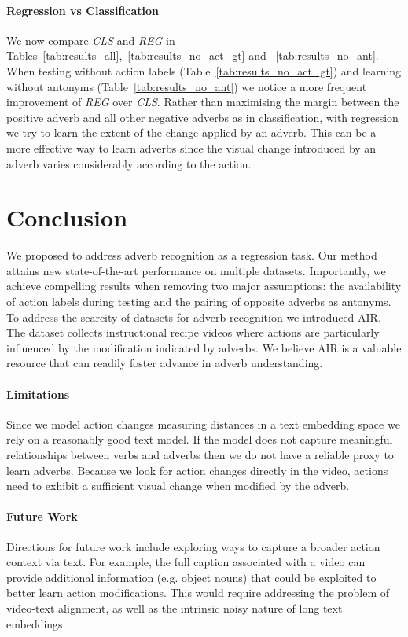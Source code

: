 \documentclass[10pt,twocolumn,letterpaper]{article}
\newcommand{\fparagraph}[1]{\paragraph{#1}}
\begin{document}
\vspace{-13pt}
\fparagraph{Regression vs Classification} We now compare \textit{CLS} and \textit{REG} in Tables~\ref{tab:results_all},~\ref{tab:results_no_act_gt} and ~\ref{tab:results_no_ant}. 
When testing without action labels (Table~\ref{tab:results_no_act_gt}) and learning without antonyms (Table~\ref{tab:results_no_ant}) we notice a more frequent improvement of \textit{REG} over \textit{CLS}.
Rather than maximising the margin between the positive adverb and all other negative adverbs as in classification, with regression we try to learn the extent of the change applied by an adverb. This can be a more effective way to learn adverbs 
since the visual change introduced by an adverb varies considerably according to the action. 

\vspace{-3pt}
\section{Conclusion}
\label{sec:conclusion}
\vspace{-2pt}

We proposed to address adverb recognition as a regression task. 
Our method attains new state-of-the-art performance on multiple datasets. Importantly, we 
achieve compelling results when removing two major assumptions: the availability of action labels during testing and the pairing of opposite adverbs as antonyms. 
To address the scarcity of datasets for adverb recognition we introduced AIR. The dataset collects instructional recipe videos where actions are particularly influenced by the modification indicated by adverbs. 
We believe AIR is a valuable resource that can readily foster advance in adverb understanding. 

\vspace{-12pt}
\fparagraph{Limitations} Since we model action changes measuring distances in a text embedding space we rely on a reasonably good text model. If the model does not capture meaningful relationships between verbs and adverbs then we do not have a reliable proxy to learn adverbs. Because we look for action changes directly in the video, 
actions need to exhibit a sufficient visual change when modified by the adverb. 

\vspace{-12pt}
\fparagraph{Future Work} Directions for future work include exploring ways to capture a broader action context via text. For example, the full caption associated with a video can provide additional information (e.g. object nouns) that could be exploited to better learn action modifications. This would require addressing the problem of video-text alignment, as well as the intrinsic noisy nature of long text embeddings.
\end{document}
